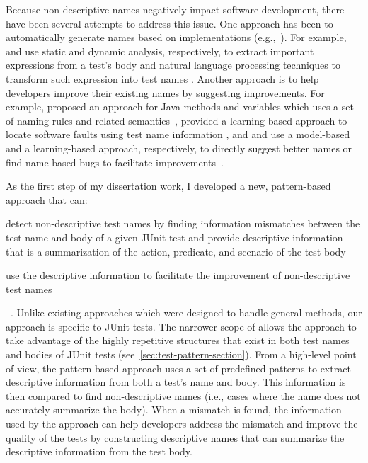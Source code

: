Because non-descriptive names negatively impact software development, there have been several attempts to address this issue.
%
One approach has been to automatically generate names based on implementations (e.g.,~\cite{arcuri2014automated, zhang2015automatically, daka2017generating}).
%
For example, \citeauthor{zhang2015automatically} and \citeauthor{daka2017generating} use static and dynamic analysis, respectively, to extract important expressions from a test's body and natural language processing techniques to transform such expression into test names \cite{zhang2015automatically, daka2017generating}. 
%
Another approach is to help developers improve their existing names by suggesting improvements.
%
For example, \citeauthor{host2009debugging} proposed an approach for Java methods and variables which uses a set of naming rules and related semantics~\cite{host2009debugging}, \citeauthor{li2019deepfl} provided a learning-based approach to locate software faults using test name information \cite{li2019deepfl}, and \citeauthor{allamanis2015suggesting} and \citeauthor{pradel2018deepbugs} use a model-based and a learning-based approach, respectively, to directly suggest better names or find name-based bugs to facilitate improvements~\cite{allamanis2015suggesting, pradel2018deepbugs}.


As the first step of my dissertation work, I developed a new, pattern-based approach that can:
\begin{enumerate*}
\item detect non-descriptive test names by finding information mismatches between the test name and body of a given JUnit test and provide descriptive information that is a summarization of the action, predicate, and scenario of the test body
\item use the descriptive information to facilitate the improvement of non-descriptive test names
\end{enumerate*}~\cite{wu2020pattern}.
%
Unlike existing approaches which were designed to handle general methods, our approach is specific to JUnit tests.
%
The narrower scope of allows the approach to take advantage of the highly repetitive structures that exist in both test names and bodies of JUnit tests (see~\cref{sec:test-pattern-section}).
%
From a high-level point of view, the pattern-based approach uses a set of predefined patterns to extract descriptive information from both a test's name and body.
%
This information is then compared to find non-descriptive names (i.e., cases where the name does not accurately summarize the body).
%
When a mismatch is found, the information used by the approach can help developers address the mismatch and improve the quality of the tests by constructing descriptive names that can summarize the descriptive information from the test body.


